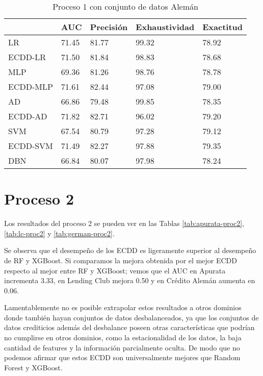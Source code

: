 \begin{table}[]
\centering
\caption{Proceso 1 con conjunto de datos Alemán}
\label{tab:german-proc1}
\begin{tabularx}{0.75\textwidth}{|l|Y Y Y Y|}
				\hline
				& AUC	   & Precisión & Exhaustividad	& Exactitud  \\
				\hline
LR			  & 71.45	 & 81.77	 & 99.32	 & 78.92	 \\
ECDD-LR		   & 71.50	 & 81.84	 & 98.83	 & 78.68	 \\
				\hline
MLP			 & 69.36	 & 81.26	 & 98.76	 & 78.78	 \\
ECDD-MLP		  & 71.61	 & 82.44	 & 97.08	 & 79.00	 \\
				\hline
AD			  & 66.86	 & 79.48	 & 99.85	 & 78.35	 \\
ECDD-AD		   & 71.82	 & 82.71	 & 96.02	 & 79.20	 \\
				\hline
SVM			 & 67.54	 & 80.79	 & 97.28	 & 79.12	 \\
ECDD-SVM		  & 71.49	 & 82.27	 & 97.88	 & 79.35	 \\
				\hline
DBN			 & 66.84	 & 80.07	 & 97.98	 & 78.24	 \\
				\hline
\end{tabularx}
\end{table}


\section{Proceso 2} %

Los resultados del proceso 2 se pueden ver en las Tablas \ref{tab:apurata-proc2}, \ref{tab:lc-proc2} y \ref{tab:german-proc2}.

Se observa que el desempeño de los \ac{ECDD} es ligeramente superior al desempeño de \ac{RF} y \ac{XGBoost}. Si comparamos la mejora obtenida por el mejor \ac{ECDD} respecto al mejor entre RF y XGBoost; vemos que el AUC en Apurata incrementa 3.33, en Lending Club mejora 0.50 y en Crédito Alemán aumenta en 0.06.

Lamentablemente no es posible extrapolar estos resultados a otros dominios donde también hayan conjuntos de datos desbalanceados, ya que los conjuntos de datos crediticios además del desbalance poseen otras características que podrían no cumplirse en otros dominios, como la estacionalidad de los datos, la baja cantidad de features y la información parcialmente oculta. De modo que no podemos afirmar que estos \ac{ECDD} son universalmente mejores que Random Forest y XGBoost.

